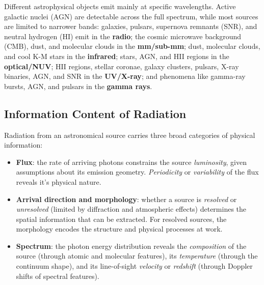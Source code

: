 \vspace{-1em}

Different astrophysical objects emit mainly at specific wavelengths. Active galactic nuclei (AGN) are detectable across the full spectrum, while most sources are limited to narrower bands: galaxies, pulsars, supernova remnants (SNR), and neutral hydrogen (HI) emit in the \textbf{radio}; the cosmic microwave background (CMB), dust, and molecular clouds in the \textbf{mm/sub-mm}; dust, molecular clouds, and cool K-M stars in the \textbf{infrared}; stars, AGN, and HII regions in the \textbf{optical/NUV}; HII regions, stellar coronae, galaxy clusters, pulsars, X-ray binaries, AGN, and SNR in the \textbf{UV/X-ray}; and phenomena like gamma-ray bursts, AGN, and pulsars in the \textbf{gamma rays}.

\vspace{-0.5em}

\subsection{Information Content of Radiation} \label{subsec:information_content}

Radiation from an astronomical source carries three broad categories of physical information:

\begin{itemize}[noitemsep]
    \item \textbf{Flux}: the rate of arriving photons constrains the source \textit{luminosity}, given assumptions about its emission geometry. \textit{Periodicity} or \textit{variability} of the flux reveals it's physical nature.

    \item \textbf{Arrival direction and morphology}: whether a source is \textit{resolved} or \textit{unresolved} (limited by diffraction and atmospheric effects) determines the spatial information that can be extracted. For resolved sources, the morphology encodes the structure and physical processes at work.

    \item \textbf{Spectrum}: the photon energy distribution reveals the \textit{composition} of the source (through atomic and molecular features), its \textit{temperature} (through the continuum shape), and its line-of-sight \textit{velocity} or \textit{redshift} (through Doppler shifts of spectral features).
\end{itemize}

\newpage

